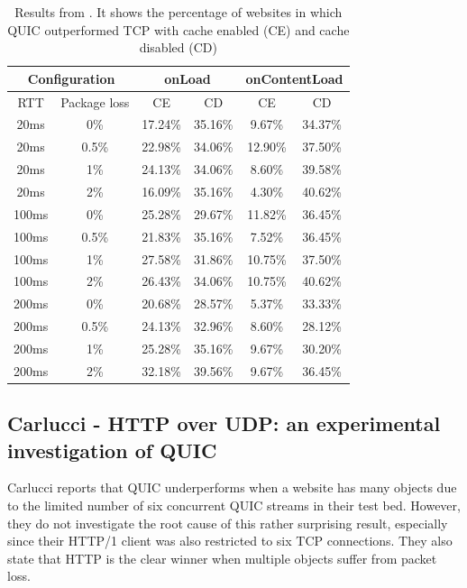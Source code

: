 \documentclass[conference]{IEEEtran}
\begin{document}
\begin{table}
\begin{center}
\begin{tabular}{|cc|cc|cc|}
\hline

\multicolumn{2}{|c|}{\textbf{Configuration}} & 
\multicolumn{2}{|c|}{\textbf{onLoad}} & 
\multicolumn{2}{|c|}{\textbf{onContentLoad}} \\
\hline

RTT & Package loss & CE & CD & CE & CD \\
\hline

20ms  & 0\%   & 17.24\% & 35.16\% & 9.67\%  & 34.37\% \\
20ms  & 0.5\% & 22.98\% & 34.06\% & 12.90\% & 37.50\% \\
20ms  & 1\%   & 24.13\% & 34.06\% & 8.60\%  & 39.58\% \\
20ms  & 2\%   & 16.09\% & 35.16\% & 4.30\%  & 40.62\% \\
100ms & 0\%   & 25.28\% & 29.67\% & 11.82\% & 36.45\% \\
100ms & 0.5\% & 21.83\% & 35.16\% & 7.52\%  & 36.45\% \\
100ms & 1\%   & 27.58\% & 31.86\% & 10.75\% & 37.50\% \\
100ms & 2\%   & 26.43\% & 34.06\% & 10.75\% & 40.62\% \\
200ms & 0\%   & 20.68\% & 28.57\% & 5.37\%  & 33.33\% \\
200ms & 0.5\% & 24.13\% & 32.96\% & 8.60\%  & 28.12\% \\
200ms & 1\%   & 25.28\% & 35.16\% & 9.67\%  & 30.20\% \\
200ms & 2\%   & 32.18\% & 39.56\% & 9.67\%  & 36.45\% \\
\hline

\end{tabular}
\end{center}

\caption{Results from \cite{Nepomuceno}. It shows the percentage of websites in which QUIC outperformed TCP with cache enabled (CE) and cache disabled (CD)}
\label{table:nepomuceno-results}
\end{table}

\subsection{Carlucci - HTTP over UDP: an experimental investigation of QUIC}

Carlucci \cite{HTTPoverUDP} reports that QUIC underperforms when a website has many objects due to the limited number of six concurrent QUIC streams in their test bed. However, they do not investigate the root cause of this rather surprising result, especially since their HTTP/1 client was also restricted to six TCP connections. They also state that HTTP is the clear winner when multiple objects suffer from packet loss.
\end{document}
